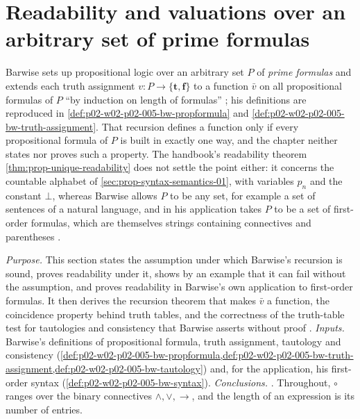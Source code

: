 \section{Readability and valuations over an arbitrary set of prime formulas}
\label{sec:p02-w02b-p02-001-prime-readability}

Barwise sets up propositional logic over an arbitrary set \(P\) of
\emph{prime formulas} and extends each truth assignment
\(v:P\to\{\mathbf t,\mathbf f\}\) to a function \(\bar v\) on all
propositional formulas of \(P\) ``by induction on length of formulas''
\cite[ch.~A.1, \S4, pp.~23--24]{Barwise1977FirstOrder}; his definitions are
reproduced in \cref{def:p02-w02-p02-005-bw-propformula} and
\cref{def:p02-w02-p02-005-bw-truth-assignment}.  That recursion defines a
function only if every propositional formula of \(P\) is built in exactly
one way, and the chapter neither states nor proves such a property.  The
handbook's readability theorem \cref{thm:prop-unique-readability} does not
settle the point either: it concerns the countable alphabet of
\cref{sec:prop-syntax-semantics-01}, with variables \(p_n\) and the constant
\(\bot\), whereas Barwise allows \(P\) to be any set, for example a set of
sentences of a natural language, and in his application takes \(P\) to be a
set of first-order formulas, which are themselves strings containing
connectives and parentheses \cite[ch.~A.1, \S4, pp.~23, 28]{Barwise1977FirstOrder}.

\emph{Purpose.}  This section states the assumption under which Barwise's
recursion is sound, proves readability under it, shows by an example that
it can fail without the assumption, and proves readability in Barwise's own
application to first-order formulas.  It then derives the recursion theorem
that makes \(\bar v\) a function, the coincidence property behind truth
tables, and the correctness of the truth-table test for tautologies and
consistency that Barwise asserts without proof
\cite[ch.~A.1, \S4, p.~25]{Barwise1977FirstOrder}.
\emph{Inputs.}  Barwise's definitions of propositional formula, truth
assignment, tautology and consistency
(\cref{def:p02-w02-p02-005-bw-propformula,def:p02-w02-p02-005-bw-truth-assignment,def:p02-w02-p02-005-bw-tautology})
and, for the application, his first-order syntax
(\cref{def:p02-w02-p02-005-bw-syntax}).
\emph{Conclusions.}
.
Throughout, \(\circ\) ranges over the binary connectives
\(\land,\lor,\to\), and the length of an expression is its number of
entries.

